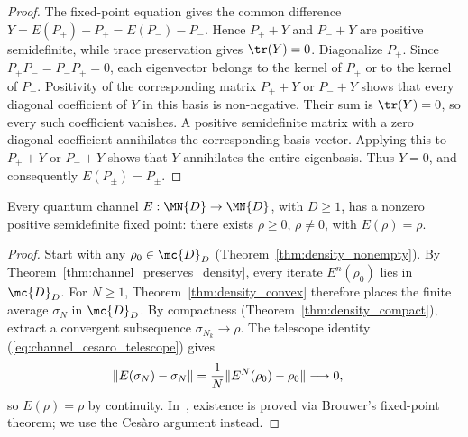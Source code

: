 \begin{proof}
    \leanok
    The fixed-point equation gives the common difference
    $Y=E(P_+)-P_+=E(P_-)-P_-$. Hence $P_++Y$ and $P_-+Y$ are positive
    semidefinite, while trace preservation gives $\tr(Y)=0$. Diagonalize
    $P_+$. Since $P_+P_-=P_-P_+=0$, each eigenvector belongs to the kernel
    of $P_+$ or to the kernel of $P_-$. Positivity of the corresponding
    matrix $P_++Y$ or $P_-+Y$ shows that every diagonal coefficient of $Y$
    in this basis is non-negative. Their sum is $\tr(Y)=0$, so every such
    coefficient vanishes. A positive semidefinite matrix with a zero diagonal
    coefficient annihilates the corresponding basis vector. Applying this to
    $P_++Y$ or $P_-+Y$ shows that $Y$ annihilates the entire eigenbasis.
    Thus $Y=0$, and consequently $E(P_\pm)=P_\pm$.
\end{proof}

\begin{theorem}\label{thm:cesaro_fixedpoint}
    \leanok
    Every quantum channel $E:\MN{D}\to\MN{D}$, with $D\geq1$, has a nonzero
    positive semidefinite fixed point: there exists $\rho\geq0$, $\rho\neq0$,
    with $E(\rho)=\rho$.
\end{theorem}

\begin{proof}
    \leanok
    Start with any $\rho_0\in\mc{D}_D$
    (Theorem~\ref{thm:density_nonempty}).
    By Theorem~\ref{thm:channel_preserves_density}, every iterate
    $E^n(\rho_0)$ lies in $\mc{D}_D$. For $N\geq1$,
    Theorem~\ref{thm:density_convex} therefore places the finite average
    $\sigma_N$ in $\mc{D}_D$.
    By compactness (Theorem~\ref{thm:density_compact}),
    extract a convergent subsequence $\sigma_{N_k}\to\rho$.
    The telescope identity (\ref{eq:channel_cesaro_telescope}) gives
    \begin{align}
        \lVert E(\sigma_N)-\sigma_N\rVert
         & =\frac{1}{N}\lVert E^N(\rho_0)-\rho_0\rVert
        \longrightarrow0,
        \notag
    \end{align}
    so $E(\rho)=\rho$ by continuity.
    In~\cite[Theorem~6.11]{Wolf2012Quantum}, existence is proved
    via Brouwer's fixed-point theorem; we use the Ces\`aro
    argument instead.
\end{proof}

